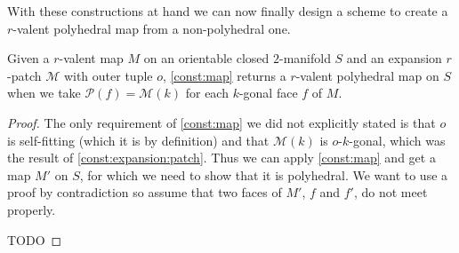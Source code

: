 With these constructions at hand we can now finally design a scheme to create a $r$-valent polyhedral map from a non-polyhedral one.

\begin{proposition}\label{thm:const:polymap}
  Given a $r$-valent map $M$ on an orientable closed $2$-manifold $S$ and an expansion $r$-patch $\mathcal{M}$ with outer tuple $o$, \autoref{const:map} returns a $r$-valent polyhedral map on $S$ when we take $\mathcal{P}(f) = \mathcal{M}(k)$ for each $k$-gonal face $f$ of $M$.
\begin{proof}
The only requirement of \autoref{const:map} we did not explicitly stated is that $o$ is self-fitting (which it is by definition) and that $\mathcal{M}(k)$ is $o$-$k$-gonal, which was the result of \autoref{const:expansion:patch}. Thus we can apply \autoref{const:map} and get a map $M'$ on $S$, for which we need to show that it is polyhedral. We want to use a proof by contradiction so assume that two faces of $M'$, $f$ and $f'$, do not meet properly.

TODO
\end{proof}
\end{proposition}


